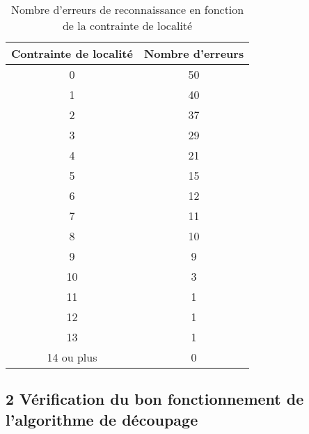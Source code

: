 \documentclass[a4paper,11pt]{article}
\begin{document}
\begin{center}


\begin{table}[H]

\begin{tabular}{|c|c|}

\hline
Contrainte de localité & Nombre d'erreurs \\
\hline
0 & 50 \\
\hline
1 & 40 \\
\hline
2 & 37 \\
\hline
3 & 29 \\
\hline
4 & 21 \\
\hline
5 & 15 \\
\hline
6 & 12 \\
\hline
7 & 11 \\
\hline
8 & 10 \\
\hline
9 & 9 \\
\hline
10 & 3 \\
\hline
11 & 1 \\
\hline
12 & 1 \\
\hline
13 & 1 \\
\hline
14 ou plus & 0 \\
\hline



\end{tabular}
\caption{Nombre d'erreurs de reconnaissance en fonction de la contrainte de localité\protect\footnotemark[2]}
 
\end{table}
\end{center}

\subsection*{2  Vérification du bon fonctionnement de l'algorithme de découpage}
\end{document}

